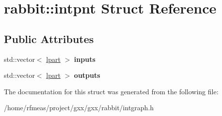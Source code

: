 \hypertarget{structrabbit_1_1intpnt}{}\section{rabbit\+:\+:intpnt Struct Reference}
\label{structrabbit_1_1intpnt}
\subsection*{Public Attributes}
\begin{DoxyCompactItemize}
\item 
std\+::vector$<$ \hyperlink{structrabbit_1_1lpart}{lpart} $>$ {\bfseries inputs}\hypertarget{structrabbit_1_1intpnt_af092e70689afe70d10710e53fcc540de}{}\label{structrabbit_1_1intpnt_af092e70689afe70d10710e53fcc540de}

\item 
std\+::vector$<$ \hyperlink{structrabbit_1_1lpart}{lpart} $>$ {\bfseries outputs}\hypertarget{structrabbit_1_1intpnt_aba823bc39262268f02021354810cbcbc}{}\label{structrabbit_1_1intpnt_aba823bc39262268f02021354810cbcbc}

\end{DoxyCompactItemize}


The documentation for this struct was generated from the following file\+:\begin{DoxyCompactItemize}
\item 
/home/rfmeas/project/gxx/gxx/rabbit/intgraph.\+h\end{DoxyCompactItemize}
